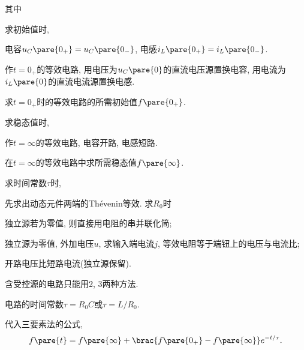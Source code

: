 \documentclass{ctexart}
\begin{document}
其中
\begin{cenum}
    \item 求初始值时,
    \begin{cenum}
        \item 电容$u_C\pare{0_+} = u_C\pare{0_-}$, 电感$i_L\pare{0_+} = i_L\pare{0_-}$.
        \item 作$t=0_+$的等效电路, 用电压为$u_C\pare{0}$的直流电压源置换电容, 用电流为$i_L\pare{0}$的直流电流源置换电感.
        \item 求$t=0_+$时的等效电路的所需初始值$f\pare{0_+}$.
    \end{cenum}
    \item 求稳态值时,
    \begin{cenum}
        \item 作$t=\infty$的等效电路, 电容开路, 电感短路.
        \item 在$t=\infty$的等效电路中求所需稳态值$f\pare{\infty}$.
    \end{cenum}
    \item 求时间常数$\tau$时,
    \begin{cenum}
        \item 先求出动态元件两端的Th\'evenin等效. 求$R_0$时
        \begin{cenum}
            \item 独立源若为零值, 则直接用电阻的串并联化简;
            \item 独立源为零值, 外加电压$u$, 求输入端电流$j$, 等效电阻等于端钮上的电压与电流比;
            \item 开路电压比短路电流(独立源保留).
        \end{cenum}
        \item 含受控源的电路只能用2, 3两种方法.
        \item 电路的时间常数$\tau = R_0C$或$\tau = L/R_0$.
    \end{cenum}
    \item 代入三要素法的公式,
    \[ f\pare{t} = f\pare{\infty} + \brac{f\pare{0_+} - f\pare{\infty}}e^{-t/\tau}. \]
\end{cenum}


\end{document}
